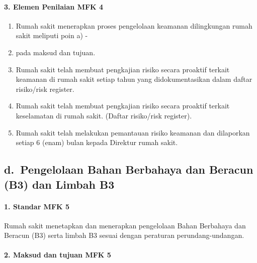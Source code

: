 \documentclass[
]{book}
\providecommand{\tightlist}{%
  \setlength{\itemsep}{0pt}\setlength{\parskip}{0pt}}
\begin{document}
\hypertarget{elemen-penilaian-mfk-4}{%
\paragraph*{3. Elemen Penilaian MFK 4}\label{elemen-penilaian-mfk-4}}

\begin{enumerate}
\def\labelenumi{\alph{enumi}.}
\tightlist
\item
  Rumah sakit menerapkan proses pengelolaan keamanan dilingkungan rumah sakit meliputi poin a) -
\item
  pada maksud dan tujuan.
\item
  Rumah sakit telah membuat pengkajian risiko secara proaktif terkait keamanan di rumah sakit setiap tahun yang didokumentasikan dalam daftar risiko/risk register.
\item
  Rumah sakit telah membuat pengkajian risiko secara proaktif terkait keselamatan di rumah sakit. (Daftar risiko/risk register).
\item
  Rumah sakit telah melakukan pemantauan risiko keamanan dan dilaporkan setiap 6 (enam) bulan kepada Direktur rumah sakit.
\end{enumerate}

\hypertarget{d.-pengelolaan-bahan-berbahaya-dan-beracun-b3-dan-limbah-b3}{%
\subsection*{d.~Pengelolaan Bahan Berbahaya dan Beracun (B3) dan Limbah B3}\label{d.-pengelolaan-bahan-berbahaya-dan-beracun-b3-dan-limbah-b3}}

\hypertarget{standar-mfk-5}{%
\paragraph*{1. Standar MFK 5}\label{standar-mfk-5}}

Rumah sakit menetapkan dan menerapkan pengelolaan Bahan Berbahaya dan Beracun (B3) serta limbah B3 sesuai dengan peraturan perundang-undangan.

\hypertarget{maksud-dan-tujuan-mfk-5}{%
\paragraph*{2. Maksud dan tujuan MFK 5}\label{maksud-dan-tujuan-mfk-5}}
\end{document}
